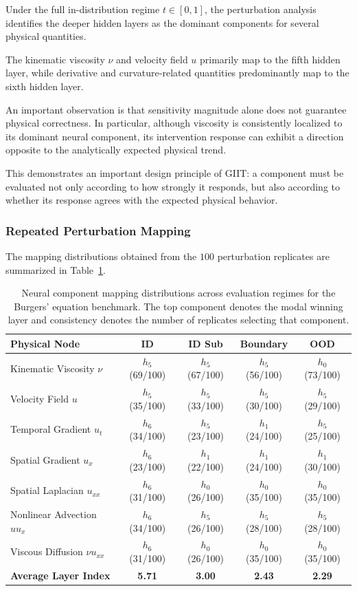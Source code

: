 \documentclass[12pt,singleside,a4paper]{article}
\begin{document}
Under the full in-distribution regime $t\in[0,1]$, the perturbation
analysis identifies the deeper hidden layers as the dominant
components for several physical quantities.

The kinematic viscosity $\nu$ and velocity field $u$ primarily map to
the fifth hidden layer, while derivative and curvature-related
quantities predominantly map to the sixth hidden layer.

An important observation is that sensitivity magnitude alone does not
guarantee physical correctness. In particular, although viscosity is
consistently localized to its dominant neural component, its
intervention response can exhibit a direction opposite to the
analytically expected physical trend.

This demonstrates an important design principle of GIIT: a component
must be evaluated not only according to how strongly it responds, but
also according to whether its response agrees with the expected
physical behavior.


\subsubsection{Repeated Perturbation Mapping}

The mapping distributions obtained from the $100$ perturbation
replicates are summarized in Table~\ref{tab:phase3_mapping}.

\begin{table}[htbp]
\centering
\caption{Neural component mapping distributions across evaluation
regimes for the Burgers' equation benchmark. The top component denotes
the modal winning layer and consistency denotes the number of
replicates selecting that component.}
\label{tab:phase3_mapping}
\begin{tabular}{lcccc}
\hline
\textbf{Physical Node}
&
\textbf{ID}
&
\textbf{ID Sub}
&
\textbf{Boundary}
&
\textbf{OOD}
\\
\hline
Kinematic Viscosity $\nu$
& $h_5$ (69/100)
& $h_5$ (67/100)
& $h_5$ (56/100)
& $h_0$ (73/100)
\\
Velocity Field $u$
& $h_5$ (35/100)
& $h_5$ (33/100)
& $h_5$ (30/100)
& $h_5$ (29/100)
\\
Temporal Gradient $u_t$
& $h_6$ (34/100)
& $h_5$ (23/100)
& $h_1$ (24/100)
& $h_5$ (25/100)
\\
Spatial Gradient $u_x$
& $h_6$ (23/100)
& $h_1$ (22/100)
& $h_1$ (24/100)
& $h_1$ (30/100)
\\
Spatial Laplacian $u_{xx}$
& $h_6$ (31/100)
& $h_0$ (26/100)
& $h_0$ (35/100)
& $h_0$ (35/100)
\\
Nonlinear Advection $uu_x$
& $h_6$ (34/100)
& $h_5$ (26/100)
& $h_5$ (28/100)
& $h_5$ (28/100)
\\
Viscous Diffusion $\nu u_{xx}$
& $h_6$ (31/100)
& $h_0$ (26/100)
& $h_0$ (35/100)
& $h_0$ (35/100)
\\
\hline
\textbf{Average Layer Index}
& \textbf{5.71}
& \textbf{3.00}
& \textbf{2.43}
& \textbf{2.29}
\\
\hline
\end{tabular}
\end{table}
\end{document}
